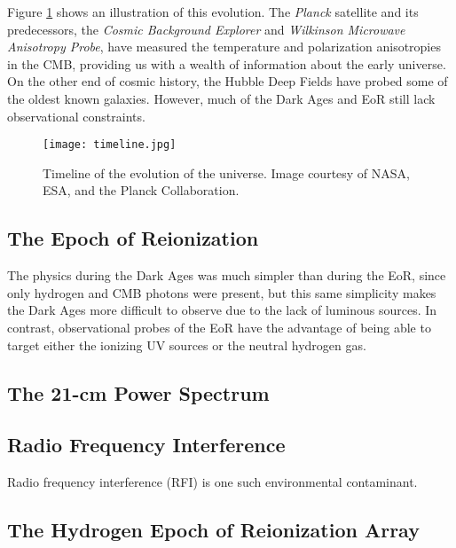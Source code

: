 \documentclass[12pt]{article}
\begin{document}
Figure \ref{fig:timeline} shows an illustration of this evolution. The \textit{Planck} satellite and its predecessors, the \textit{Cosmic Background Explorer} and \textit{Wilkinson Microwave Anisotropy Probe}, have measured the temperature and polarization anisotropies in the CMB, providing us with a wealth of information about the early universe. On the other end of cosmic history, the Hubble Deep Fields have probed some of the oldest known galaxies. However, much of the Dark Ages and EoR still lack observational constraints. 

\begin{figure}[tb]
	\centering
	\texttt{[image: timeline.jpg]}
	\caption[Timeline of the universe]{Timeline of the evolution of the universe. Image courtesy of NASA, ESA, and the Planck Collaboration.}
	\label{fig:timeline}
\end{figure}

\subsection{The Epoch of Reionization} \label{subsec:eor}

The physics during the Dark Ages was much simpler than during the EoR, since only hydrogen and CMB photons were present, but this same simplicity makes the Dark Ages more difficult to observe due to the lack of luminous sources. In contrast, observational probes of the EoR have the advantage of being able to target either the ionizing UV sources or the neutral hydrogen gas.


\subsection{The 21-cm Power Spectrum} \label{subsec:ps}

\red{[What is it?]}


\subsection{Radio Frequency Interference} \label{subsec:rfi}

Radio frequency interference (RFI) is one such environmental contaminant.

\subsection{The Hydrogen Epoch of Reionization Array} \label{subsec:hera}
\end{document}
